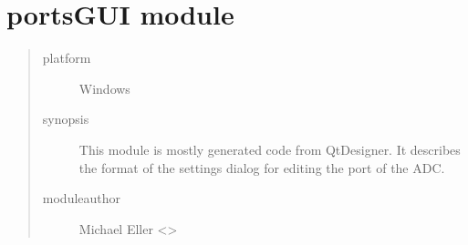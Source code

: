 \documentclass[letterpaper,10pt,english]{sphinxmanual}
\begin{document}
\section{portsGUI module}
\label{\detokenize{portsGUI:module-portsGUI}}\label{\detokenize{portsGUI:portsgui-module}}\label{\detokenize{portsGUI::doc}}\begin{quote}\begin{description}
\item[{platform}] \leavevmode
Windows

\item[{synopsis}] \leavevmode
This module is mostly generated code from QtDesigner. It describes the format of the settings
dialog for editing the port of the ADC.

\item[{moduleauthor}] \leavevmode
Michael Eller \textless{}\textgreater{}

\end{description}\end{quote}
\end{document}
